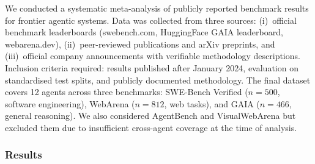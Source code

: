 \documentclass[review,authoryear]{elsarticle}
\theoremstyle{definition}
\begin{document}
We conducted a systematic meta-analysis of publicly reported benchmark results for frontier agentic systems. Data was collected from three sources: (i)~official benchmark leaderboards (swebench.com, HuggingFace GAIA leaderboard, webarena.dev), (ii)~peer-reviewed publications and arXiv preprints, and (iii)~official company announcements with verifiable methodology descriptions. Inclusion criteria required: results published after January 2024, evaluation on standardised test splits, and publicly documented methodology. The final dataset covers 12 agents across three benchmarks: SWE-Bench Verified \citep{jimenez2024swebench} ($n=500$, software engineering), WebArena \citep{zhou2024webarena} ($n=812$, web tasks), and GAIA \citep{mialon2023gaia} ($n=466$, general reasoning). We also considered AgentBench \citep{liu2024agentbench} and VisualWebArena \citep{koh2024visualwebarena} but excluded them due to insufficient cross-agent coverage at the time of analysis.

\subsubsection{Results}
\end{document}
